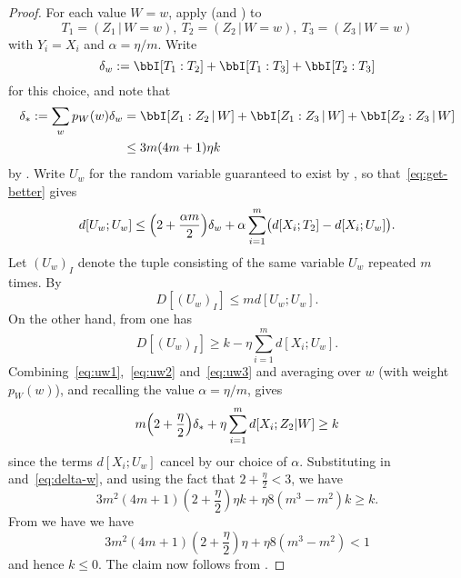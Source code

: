 \begin{proof}\leanok For each value $W=w$, apply  (and ) to
  \[
    T_1 = (Z_1 \,|\, W \mathop{=} w),\
    T_2 = (Z_2 \,|\, W \mathop{=} w),\
    T_3 = (Z_3 \,|\, W \mathop{=} w)
  \]
  with $Y_i=X_i$ and $\alpha=\eta/m$.  Write
  \[
    \delta_w :=  \bbI[T_1 : T_2] + \bbI[T_1 : T_3] + \bbI[T_2 : T_3]
  \]
  for this choice, and note that
  \begin{align}
    \label{eq:delta-w}
    \nonumber
    \delta_\ast := \sum_w p_W(w) \delta_w &= \bbI[Z_1 : Z_2 \,|\, W] + \bbI[Z_1 : Z_3 \,|\, W] + \bbI[Z_2 : Z_3 \,|\, W] \\
                           & \leq 3 m (4m+1) \eta k
  \end{align}
  by \Cref{prop:52}.
  Write $U_w$ for the random variable guaranteed to exist by ,
  so that~\eqref{eq:get-better} gives \begin{equation}
    \label{eq:uw1}
    d[U_w; U_w] \leq \Bigl( 2 + \frac{\alpha m}{2} \Bigr) \delta_w + \alpha \sum_{i=1}^m \bigl( d[X_i; T_2] - d[X_i; U_w] \bigr).
  \end{equation}
  Let $(U_w)_I$ denote the tuple consisting of the same variable $U_w$ repeated $m$ times.
  By 
  \begin{equation}
    \label{eq:uw2}
    D[(U_w)_I] \leq m d[U_w; U_w].
  \end{equation}
  On the other hand, from  one has
  \begin{equation}
    \label{eq:uw3}
    D[(U_w)_I] \geq k - \eta \sum_{i=1}^m d[X_i;U_w].
  \end{equation}
  Combining~\eqref{eq:uw1},~\eqref{eq:uw2} and~\eqref{eq:uw3} and averaging over $w$ (with weight $p_W(w)$), and recalling the value $\alpha=\eta/m$, gives
  \[
     m \Bigl( 2 + \frac{\eta}{2} \Bigr) \delta_\ast + \eta \sum_{i=1}^m d[X_i; Z_2 | W]
    \geq k
  \]
  since the terms $d[X_i; U_w]$ cancel by our choice of $\alpha$.
  Substituting in  and~\eqref{eq:delta-w}, and using the fact that $2 + \frac{\eta}{2} < 3$, we have
  \[
    3 m^2 (4m+1) (2+\frac{\eta}{2}) \eta k + \eta 8(m^3-m^2) k \geq k.
  \]
  From \Cref{eta-def-multi} we have we have
  $$ 3 m^2 (4m+1) (2+\frac{\eta}{2}) \eta + \eta 8(m^3-m^2) < 1$$
  and hence $k \leq 0$.  The claim now follows from .
\end{proof}


